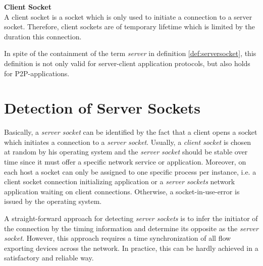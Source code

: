 \parbox{ 
\textwidth}{ 
\begin{defn}
	{\textbf{Client Socket}\\} A client socket is a socket which is only used to initiate a connection to a server socket. Therefore, client sockets are of temporary lifetime which is limited by the duration this connection. 
\end{defn}
}

In spite of the containment of the term \emph{server} in definition \ref{def:serversocket}, this definition is not only valid for server-client application protocols, but also holds for P2P-applications. 

\section{Detection of Server Sockets 
\label{section:socket_detection}}

Basically, a \emph{server socket} can be identified by the fact that a client opens a socket which initiates a connection to a \emph{server socket}. Usually, a \emph{client socket} is chosen at random by his operating system and the \emph{server socket} should be stable over time since it must offer a specific network service or application. Moreover, on each host a socket can only be assigned to one specific process per instance, i.e. a client socket connection initializing application or a \emph{server sockets} network application waiting on client connections. Otherwise, a socket-in-use-error is issued by the operating system. 

A straight-forward approach for detecting \emph{server sockets} is to infer the initiator of the connection by the timing information and determine its opposite as the \emph{server socket}. However, this approach requires a time synchronization of all flow exporting devices across the network. In practice, this can be hardly achieved in a satisfactory and reliable way.

